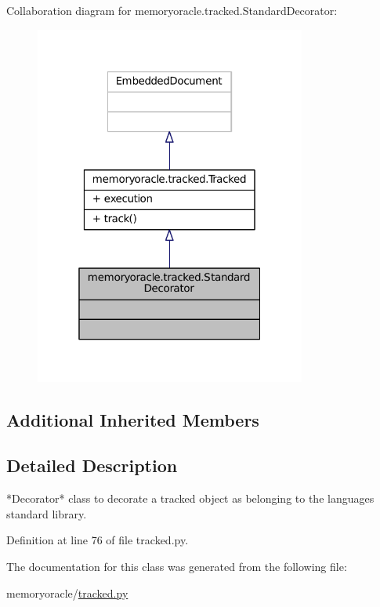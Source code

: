 Collaboration diagram for memoryoracle.\+tracked.\+Standard\+Decorator\+:
\nopagebreak
\begin{figure}[H]
\begin{center}
\leavevmode
\includegraphics[width=253pt]{classmemoryoracle_1_1tracked_1_1StandardDecorator__coll__graph}
\end{center}
\end{figure}
\subsection*{Additional Inherited Members}


\subsection{Detailed Description}
\begin{DoxyVerb}*Decorator* class to decorate a tracked object as belonging to
the languages standard library.
\end{DoxyVerb}
 

Definition at line 76 of file tracked.\+py.



The documentation for this class was generated from the following file\+:\begin{DoxyCompactItemize}
\item 
memoryoracle/\hyperlink{tracked_8py}{tracked.\+py}\end{DoxyCompactItemize}
